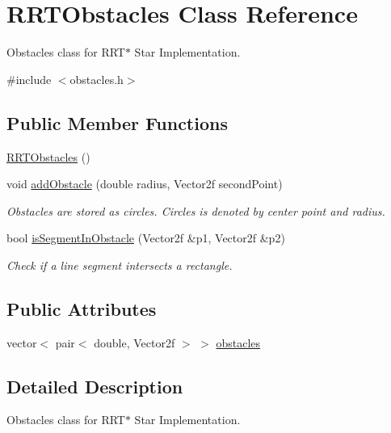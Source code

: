 \hypertarget{classRRTObstacles}{}\section{R\+R\+T\+Obstacles Class Reference}
\label{classRRTObstacles}


Obstacles class for R\+R\+T$\ast$ Star Implementation.  




{\ttfamily \#include $<$obstacles.\+h$>$}

\subsection*{Public Member Functions}
\begin{DoxyCompactItemize}
\item 
\hyperlink{classRRTObstacles_a2a8b080aee81476a84987f9cc3aa6186}{R\+R\+T\+Obstacles} ()
\item 
void \hyperlink{classRRTObstacles_a0359d5f53c91410a35eb1bbb8920f8dc}{add\+Obstacle} (double radius, Vector2f second\+Point)
\begin{DoxyCompactList}\small\item\em Obstacles are stored as circles. Circles is denoted by center point and radius. \end{DoxyCompactList}\item 
bool \hyperlink{classRRTObstacles_a1bf5b6afa6aa7704584febd7b2d1550a}{is\+Segment\+In\+Obstacle} (Vector2f \&p1, Vector2f \&p2)
\begin{DoxyCompactList}\small\item\em Check if a line segment intersects a rectangle. \end{DoxyCompactList}\end{DoxyCompactItemize}
\subsection*{Public Attributes}
\begin{DoxyCompactItemize}
\item 
vector$<$ pair$<$ double, Vector2f $>$ $>$ \hyperlink{classRRTObstacles_a0bbd43d5b8ddeb2f293f689d09c26947}{obstacles}
\end{DoxyCompactItemize}


\subsection{Detailed Description}
Obstacles class for R\+R\+T$\ast$ Star Implementation. 

